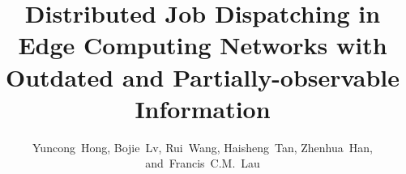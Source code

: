 \documentclass[10pt,conference]{IEEEtran} %
\theoremstyle{definition}             %
\theoremstyle{remark}                 %
\theoremstyle{plain}                  %
\begin{document}
    \title{
        Distributed Job Dispatching in Edge Computing Networks with Outdated and Partially-observable Information
    }

    \author{
        Yuncong~Hong,%
        Bojie~Lv,%
        Rui~Wang,%
        Haisheng~Tan,%
        Zhenhua~Han,%
        and~Francis~C.M.~Lau%
    }%


    \maketitle
    
        
    

    
    

    
    
    
\end{document}
